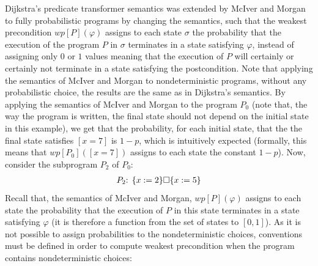 \documentclass[a4paper,10pt]{llncs}
\begin{document}
Dijkstra's predicate transformer semantics was extended by McIver and Morgan \cite{McIver05} to fully probabilistic programs by changing the semantics, such that the weakest precondition $wp[P](\varphi)$ assigns to each state $\sigma$ the probability that the execution of the program $P$ in $\sigma$ terminates in a state satisfying $\varphi$, instead of assigning only $0$ or $1$ values meaning that the execution of $P$ will certainly or certainly not terminate in a state satisfying the postcondition. Note that applying the semantics of McIver and Morgan to nondeterministic programs, without any probabilistic choice, the results are the same as in Dijkstra's semantics.\newline
By applying the semantics of McIver and Morgan to the program $P_0$ (note that, the way the program is written, the final state should not depend on the initial state in this example), we get that the probability, for each initial state, that the the final state satisfies $[x = 7]$ is $1-p$, which is intuitively expected (formally, this means that $wp[P_0]([x = 7])$ assigns to each state the constant $1-p$). Now, consider the subprogram $P_2$ of $P_0$:
\begin{align*}
 P_2\textnormal{: } \{x := 2\} \square \{x := 5\} 
\end{align*}
Recall that, the semantics of McIver and Morgan, $wp[P](\varphi)$ assigns to each state the probability that the execution of $P$ in this state terminates in a state satisfying $\varphi$ (it is therefore a function from the set of states to $[0,1]$).
As it is not possible to assign probabilities to the nondeterministic choices, conventions must be defined in order to compute weakest precondition when the program contains nondeterministic choices:
\end{document}
